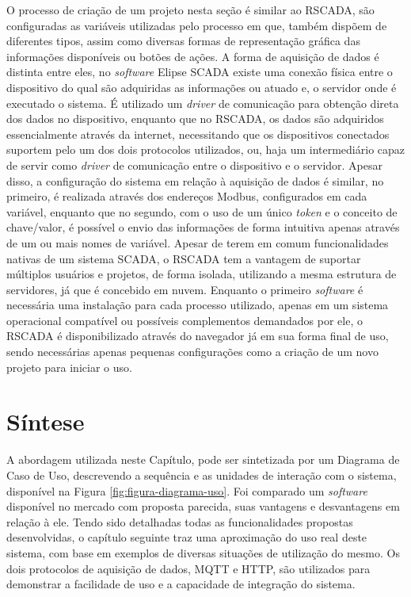 O processo de criação de um projeto nesta seção é similar ao RSCADA, são configuradas as variáveis utilizadas pelo processo em que, também dispõem de diferentes tipos, assim como diversas formas de representação gráfica das informações disponíveis ou botões de ações. A forma de aquisição de dados é distinta entre eles, no \textit{software} Elipse \gls{SCADA} existe uma conexão física entre o dispositivo do qual são adquiridas as informações ou atuado e, o servidor onde é executado o sistema. É utilizado um \textit{driver} de comunicação para obtenção direta dos dados no dispositivo, enquanto que no RSCADA, os dados são adquiridos essencialmente através da internet, necessitando que os dispositivos conectados suportem pelo um dos dois protocolos utilizados, ou, haja um intermediário capaz de servir como \textit{driver} de comunicação entre o dispositivo e o servidor. Apesar disso, a configuração do sistema em relação à aquisição de dados é similar, no primeiro, é realizada através dos endereços Modbus, configurados em cada variável, enquanto que no segundo, com o uso de um único \textit{token} e o conceito de chave/valor, é possível o envio das informações de forma intuitiva apenas através de um ou mais nomes de variável. Apesar de terem em comum funcionalidades nativas de um sistema \gls{SCADA}, o RSCADA tem a vantagem de suportar múltiplos usuários e projetos, de forma isolada, utilizando a mesma estrutura de servidores, já que é concebido em nuvem. Enquanto o primeiro \textit{software} é necessária uma instalação para cada processo utilizado, apenas em um sistema operacional compatível ou possíveis complementos demandados por ele, o RSCADA é disponibilizado através do navegador já em sua forma final de uso, sendo necessárias apenas pequenas configurações como a criação de um novo projeto para iniciar o uso.
    	
\section{Síntese}
\label{sec:sintese-rscada}

A abordagem utilizada neste Capítulo, pode ser sintetizada por um Diagrama de Caso de Uso, descrevendo a sequência e as unidades de interação com o sistema, disponível na Figura \ref{fig:figura-diagrama-uso}. Foi comparado um \textit{software} disponível no mercado com proposta parecida, suas vantagens e desvantagens em relação à ele. Tendo sido detalhadas todas as funcionalidades propostas desenvolvidas, o capítulo seguinte traz uma aproximação do uso real deste sistema, com base em exemplos de diversas situações de utilização do mesmo. Os dois protocolos de aquisição de dados, \gls{MQTT} e \gls{HTTP}, são utilizados para demonstrar a facilidade de uso e a capacidade de integração do sistema.

